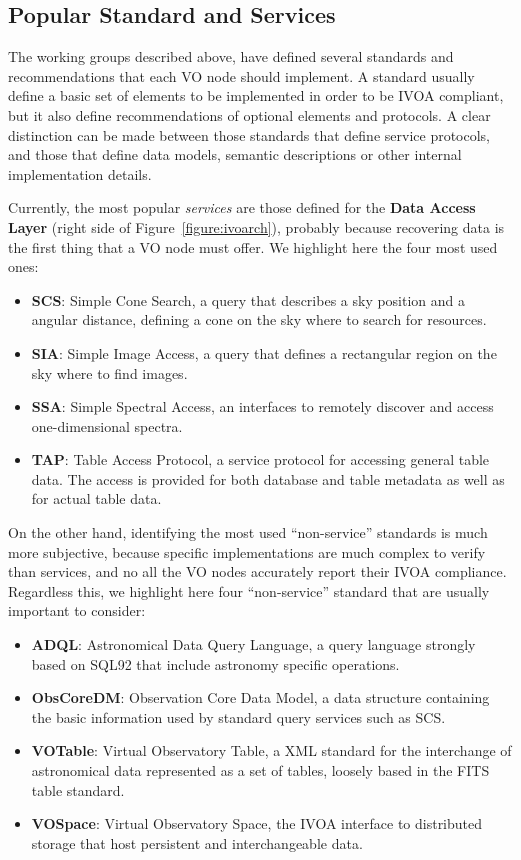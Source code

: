 \subsection{Popular Standard and Services}
\label{sec:popservices}

The working groups described above, have defined several standards
and recommendations that each VO node should implement. A standard usually 
define a basic set of elements to be implemented in order
to be IVOA compliant, but it also define recommendations of optional
elements and protocols. A clear distinction can be made between those
standards that define service protocols, and those that define data models,
semantic descriptions or other internal implementation details.

Currently, the most popular \emph{services} are those defined for
the \textbf{Data Access Layer} (right side of Figure~\ref{figure:ivoarch}), 
probably because recovering data is the first thing that a VO node must offer.
We highlight here the four most used ones:
\begin{itemize}
\item \textbf{SCS}: Simple Cone Search, a query that describes a sky position and a
angular distance, defining a cone on the sky where to search for resources.
\item \textbf{SIA}: Simple Image Access, a query that defines a rectangular region on
the sky where to find images.
\item \textbf{SSA}: Simple Spectral Access, an interfaces to remotely discover
and access one-dimensional spectra. 
\item \textbf{TAP}: Table Access Protocol, a service protocol for accessing
general table data. The access is provided for both database and table metadata
as well as for actual table data.
\end{itemize}

On the other hand, identifying the most used ``non-service'' standards is much
more subjective, because specific implementations are much complex to verify
than services, and no all the VO nodes accurately report their IVOA compliance. 
Regardless this, we highlight here four ``non-service'' standard that are usually important
to consider:
\begin{itemize}
\item \textbf{ADQL}: Astronomical Data Query Language, a query language strongly
based on SQL92 that include astronomy specific operations. 
\item \textbf{ObsCoreDM}: Observation Core Data Model, a data structure
containing the basic information used by standard query services such as SCS.
\item \textbf{VOTable}: Virtual Observatory Table, a XML standard for the
interchange of astronomical data represented as a set of tables, loosely based 
in the FITS table standard.
\item \textbf{VOSpace}: Virtual Observatory Space, the IVOA interface to
distributed storage that host persistent and interchangeable data.
\end{itemize}

